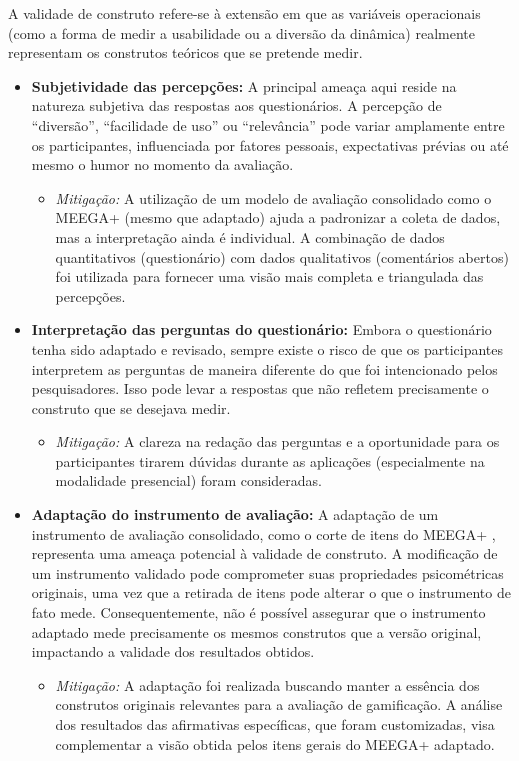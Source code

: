 \documentclass[
	12pt,
	openright,
	twoside,
	a4paper,
	english,
	brazil
	]{abntex2}
\begin{document}
A validade de construto refere-se à extensão em que as variáveis operacionais (como a forma de medir a usabilidade ou a diversão da dinâmica) realmente representam os construtos teóricos que se pretende medir.
\begin{itemize}
  \item \textbf{Subjetividade das percepções:} A principal ameaça aqui reside na natureza subjetiva das respostas aos questionários. A percepção de “diversão”, “facilidade de uso” ou “relevância” pode variar amplamente entre os participantes, influenciada por fatores pessoais, expectativas prévias ou até mesmo o humor no momento da avaliação.
  \begin{itemize}
    \item \textit{Mitigação:} A utilização de um modelo de avaliação consolidado como o MEEGA+ (mesmo que adaptado) ajuda a padronizar a coleta de dados, mas a interpretação ainda é individual. A combinação de dados quantitativos (questionário) com dados qualitativos (comentários abertos) foi utilizada para fornecer uma visão mais completa e triangulada das percepções.
    \end{itemize}
  \item \textbf{Interpretação das perguntas do questionário:} Embora o questionário tenha sido adaptado e revisado, sempre existe o risco de que os participantes interpretem as perguntas de maneira diferente do que foi intencionado pelos pesquisadores. Isso pode levar a respostas que não refletem precisamente o construto que se desejava medir.
  \begin{itemize}
    \item \textit{Mitigação:} A clareza na redação das perguntas e a oportunidade para os participantes tirarem dúvidas durante as aplicações (especialmente na modalidade presencial) foram consideradas.
    \end{itemize}
  \item \textbf{Adaptação do instrumento de avaliação:} A adaptação de um instrumento de avaliação consolidado, como o corte de itens do MEEGA+ \cite{MEEGA}, representa uma ameaça potencial à validade de construto. A modificação de um instrumento validado pode comprometer suas propriedades psicométricas originais, uma vez que a retirada de itens pode alterar o que o instrumento de fato mede. Consequentemente, não é possível assegurar que o instrumento adaptado mede precisamente os mesmos construtos que a versão original, impactando a validade dos resultados obtidos.
  \begin{itemize}
    \item \textit{Mitigação:} A adaptação foi realizada buscando manter a essência dos construtos originais relevantes para a avaliação de gamificação. A análise dos resultados das afirmativas específicas, que foram customizadas, visa complementar a visão obtida pelos itens gerais do MEEGA+ adaptado.

\end{itemize}
\end{itemize}
\end{document}

